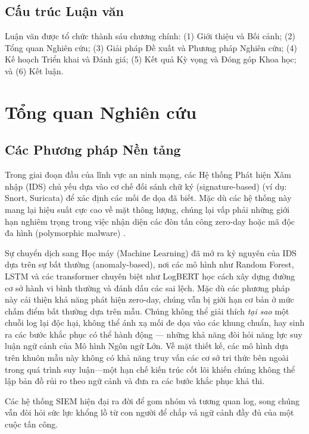 \documentclass[12pt,a4paper]{article}
\begin{document}
\subsection{Cấu trúc Luận văn}
Luận văn được tổ chức thành sáu chương chính: (1) Giới thiệu và Bối cảnh; (2) Tổng quan Nghiên cứu; (3) Giải pháp Đề xuất và Phương pháp Nghiên cứu; (4) Kế hoạch Triển khai và Đánh giá; (5) Kết quả Kỳ vọng và Đóng góp Khoa học; và (6) Kết luận.

\newpage
\section{Tổng quan Nghiên cứu}

\subsection{Các Phương pháp Nền tảng}
Trong giai đoạn đầu của lĩnh vực an ninh mạng, các Hệ thống Phát hiện Xâm nhập (IDS) chủ yếu dựa vào cơ chế đối sánh chữ ký (signature-based) (ví dụ: Snort, Suricata) để xác định các mối đe dọa đã biết. Mặc dù các hệ thống này mang lại hiệu suất cực cao về mặt thông lượng, chúng lại vấp phải những giới hạn nghiêm trọng trong việc nhận diện các đòn tấn công zero-day hoặc mã độc đa hình (polymorphic malware) \cite{khraisat2019}.

Sự chuyển dịch sang Học máy (Machine Learning) đã mở ra kỷ nguyên của IDS dựa trên sự bất thường (anomaly-based), nơi các mô hình như Random Forest, LSTM và các transformer chuyên biệt như LogBERT \cite{logbert2021} học cách xây dựng đường cơ sở hành vi bình thường và đánh dấu các sai lệch. Mặc dù các phương pháp này cải thiện khả năng phát hiện zero-day, chúng vẫn bị giới hạn cơ bản ở mức chấm điểm bất thường dựa trên mẫu. Chúng không thể giải thích \textit{tại sao} một chuỗi log lại độc hại, không thể ánh xạ mối đe dọa vào các khung chuẩn, hay sinh ra các bước khắc phục có thể hành động --- những khả năng đòi hỏi năng lực suy luận ngữ cảnh của Mô hình Ngôn ngữ Lớn. Về mặt thiết kế, các mô hình dựa trên khuôn mẫu này không có khả năng truy vấn các cơ sở tri thức bên ngoài trong quá trình suy luận—một hạn chế kiến trúc cốt lõi khiến chúng không thể lập bản đồ rủi ro theo ngữ cảnh và đưa ra các bước khắc phục khả thi.

Các hệ thống SIEM hiện đại ra đời để gom nhóm và tương quan log, song chúng vẫn đòi hỏi sức lực khổng lồ từ con người để chắp vá ngữ cảnh đầy đủ của một cuộc tấn công.
\end{document}
